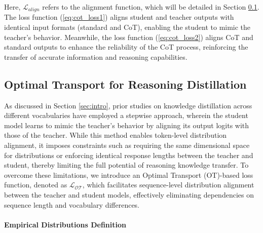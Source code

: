 Here, $\mathcal{L}_{align}$ refers to the alignment function, which will be detailed in Section \ref{sec:otalign}. The loss function (\ref{eq:cot_loss1}) aligns student and teacher outputs with identical input formats (standard and CoT), enabling the student to mimic the teacher’s behavior. Meanwhile, the loss function (\ref{eq:cot_loss2}) aligns CoT and standard outputs to enhance the reliability of the CoT process, reinforcing the transfer of accurate information and reasoning capabilities.



\subsection{Optimal Transport for Reasoning Distillation}\label{sec:otalign}

As discussed in Section \ref{sec:intro}, prior studies on knowledge distillation across different vocabularies have employed a stepwise approach, wherein the student model learns to mimic the teacher’s behavior by aligning its output logits with those of the teacher. While this method enables token-level distribution alignment, it imposes constraints such as requiring the same dimensional space for distributions or enforcing identical response lengths between the teacher and student, thereby limiting the full potential of reasoning knowledge transfer. To overcome these limitations, we introduce an Optimal Transport (OT)-based loss function, denoted as $\mathcal{L_{OT}}$, which facilitates sequence-level distribution alignment between the teacher and student models, effectively eliminating dependencies on sequence length and vocabulary differences.


\paragraph{Empirical Distributions Definition} 

